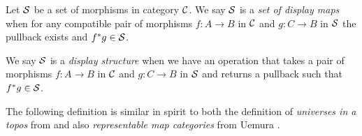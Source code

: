 \begin{dfn}[Display]
  Let $\mathcal{S}$ be a set of morphisms in category $\mathcal{C}$.
  We say $\mathcal{S}$ is a \textit{set of display maps} when for any compatible
  pair of morphisms $f : A \to B$ in $\mathcal{C}$ and $g : C \to B$ in $\mathcal{S}$
  the pullback exists and $f^{*}g \in \mathcal{S}$.

  We say $\mathcal{S}$ is a \textit{display structure} when we have an operation that
  takes a pair of morphisms $f : A \to B$ in $\mathcal{C}$ and $g : C \to B$ in $\mathcal{S}$
  and returns a pullback such that $f^{*}g \in \mathcal{S}$.
\end{dfn}


The following definition is similar in spirit to both the definition of
\textit{universes in a topos} from \cite{streicher} and also
\textit{representable map categories} from Uemura \cite{uemura2019general}.


